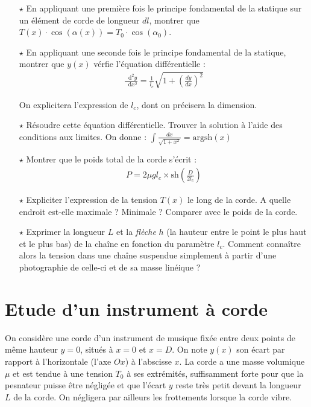 \documentclass{report}
\newcommand*\dif{\mathop{}\!\mathrm{d}}
\begin{document}
\begin{itemize}

	\item[$\star$] En appliquant une première fois le principe fondamental de la statique sur un élément de corde de longueur $dl$, montrer que $T(x)\cdot\cos(\alpha(x))=T_0\cdot\cos(\alpha_0)$.

	\item[$\star$] En appliquant une seconde fois le principe fondamental de la statique, montrer que $y(x)$ vérfie l'équation différentielle :
	\begin{align*}
		\frac{\dif^2 y}{\dif x^2} =\frac{1}{l_c}\sqrt{1+\left( \frac{dy}{dx}\right)^2}
	\end{align*}	
	
	On explicitera l'expression de $l_c$, dont on précisera la dimension.
	
	\item[$\star$] Résoudre cette équation différentielle. Trouver la solution à l'aide des conditions aux limites. On donne : $\int \frac{dx}{\sqrt{1+x^2}}=\mathrm{argsh}(x)$
	
	\item[$\star$] Montrer que le poids total de la corde s'écrit :
\begin{align*}
		P = 2 \mu g l_c\times\mathrm{sh}\left(\frac{D}{2l_c} \right) 
\end{align*}
	
	\item[$\star$] Expliciter l'expression de la tension $T(x)$ le long de la corde. A quelle endroit est-elle maximale ? Minimale ? Comparer avec le poids de la corde. 
	
	\item[$\star$] Exprimer la longueur $L$ et la \textit{flèche} $h$ (la hauteur entre le point le plus haut et le plus bas) de la chaîne en fonction du paramètre $l_c$. Comment connaître alors la tension dans une chaîne suspendue simplement à partir d'une photographie de celle-ci et de sa masse linéique ?
	
\end{itemize}

\newpage

\section*{Etude d'un instrument à corde}

On considère une corde d'un instrument de musique fixée entre deux points de même hauteur $y=0$, situés à $x=0$ et $x=D$. On note $y(x)$ son écart par rapport à l'horizontale (l'axe $Ox$) à l'abscisse $x$. La corde a une masse volumique $\mu$ et est tendue à une tension $T_0$ à ses extrémités, suffisamment forte pour que la pesnateur puisse être négligée et que l'écart $y$ reste très petit devant la longueur $L$ de la corde. On négligera par ailleurs les frottements lorsque la corde vibre.
\end{document}
